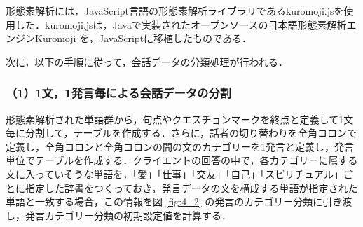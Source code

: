\documentclass[shuuron]{kuee}
\begin{document}
形態素解析には，JavaScript言語の形態素解析ライブラリであるkuromoji.js\cite{kuromojijs}を使用した．kuromoji.jsは，Javaで実装されたオープンソースの日本語形態素解析エンジンKuromoji
\cite{kuromoji}
を，JavaScriptに移植したものである．

次に，以下の手順に従って，会話データの分類処理が行われる．

\subsubsection{（1）1文，1発言毎による会話データの分割}%
形態素解析された単語群から，句点やクエスチョンマークを終点と定義して1文毎に分割して，テーブルを作成する．さらに，話者の切り替わりを全角コロンで定義し，全角コロンと全角コロンの間の文のカテゴリーを1発言と定義し，発言単位でテーブルを作成する．クライエントの回答の中で，各カテゴリーに属する文に入っていそうな単語を，「愛」「仕事」「交友」「自己」「スピリチュアル」ごとに指定した辞書をつくっておき，発言データの文を構成する単語が指定された単語と一致する場合，この情報を図
\ref{fig:4_2}
の発言のカテゴリー分類に引き渡し，発言カテゴリー分類の初期設定値を計算する．






\end{document}
